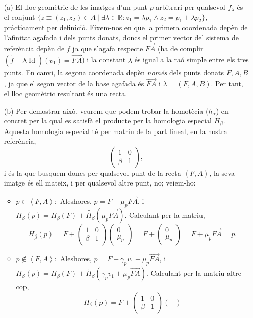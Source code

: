 \documentclass[11pt]{article}
\DeclareMathOperator{\idn}{Id}
\begin{document}
\begin{enumerate}
	\item[(a)]	El lloc geomètric de les imatges d'un punt $p$ arbitrari per qualsevol $f_{\lambda}$ és el conjunt $\{z\equiv(z_1,z_2)\in A\ \vert\ \exists\lambda\in\mathbb{R}:z_1=\lambda p_1\wedge z_2=p_1+\lambda p_2\}$, pràcticament per definició. Fixem-nos en que la primera coordenada depèn de l'afinitat agafada i dels punts donats, doncs el primer vector del sistema de referència depèn de $f$ ja que s'agafa respecte $\vec{FA}$ (ha de complir $(\tilde{f}-\lambda\idn)(v_1)=\vec{FA}$) i la constant $\lambda$ és igual a la raó simple entre els tres punts. En canvi, la segona coordenada depèn \textit{només} dels punts donats $F,A,B$, ja que el segon vector de la base agafada és $\vec{FA}$ i $\lambda=(F,A,B)$. Per tant, el lloc geomètric resultant és una recta.
	\item[(b)]	Per demostrar això, veurem que podem trobar la homotècia ($h_{\alpha}$) en concret per la qual es satisfà el producte per la homologia especial $H_{\beta}$. Aquesta homologia especial té per matriu de la part lineal, en la nostra referència,
	\[
	\begin{pmatrix}
	1&0\\
	\beta&1
	\end{pmatrix},
	\]
	i és la que busquem doncs per qualsevol punt de la recta $\left<F,A\right>$, la seva imatge és ell mateix, i per qualsevol altre punt, no; veiem-ho:
	\begin{itemize}
		\item $p\in \left<F,A\right>:$ Aleshores, $p=F+\mu_{p}\vec{FA}$, i $H_{\beta}(p)=H_{\beta}(F)+\tilde{H_{\beta}}(\mu_p\vec{FA})$. Calculant per la matriu,
		\[
		H_{\beta}(p)=F+\begin{pmatrix}
		1&0\\ \beta&1\end{pmatrix}\begin{pmatrix}
		0\\ \mu_p
		\end{pmatrix}=F+\begin{pmatrix}
		0\\ \mu_p
		\end{pmatrix}=F+\mu_p\vec{FA}=p.
		\]
		\item $p\not\in \left<F,A\right>:$ Aleshores, $p=F+\gamma_p v_1+\mu_p\vec{FA}$, i $H_{\beta}(p)=H_{\beta}(F)+\tilde{H_{\beta}}(\gamma_p v_1+\mu_p\vec{FA})$. Calculant per la matriu altre cop,
		\[
		H_{\beta}(p)=F+\begin{pmatrix}
		1&0\\ \beta&1\end{pmatrix}\begin{pmatrix}

\end{pmatrix}\]
\end{itemize}
\end{enumerate}
\end{document}

